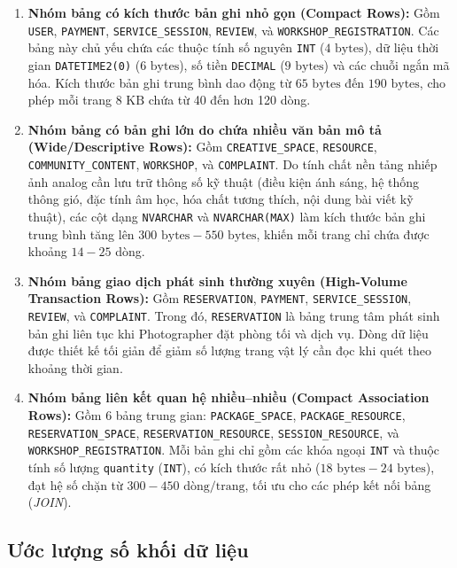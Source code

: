 \begin{enumerate}
    \item \textbf{Nhóm bảng có kích thước bản ghi nhỏ gọn (Compact Rows):}
    Gồm \texttt{USER}, \texttt{PAYMENT}, \texttt{SERVICE\_SESSION}, \texttt{REVIEW}, và \texttt{WORKSHOP\_REGISTRATION}. Các bảng này chủ yếu chứa các thuộc tính số nguyên \texttt{INT} ($4\text{ bytes}$), dữ liệu thời gian \texttt{DATETIME2(0)} ($6\text{ bytes}$), số tiền \texttt{DECIMAL} ($9\text{ bytes}$) và các chuỗi ngắn mã hóa. Kích thước bản ghi trung bình dao động từ $65\text{ bytes}$ đến $190\text{ bytes}$, cho phép mỗi trang $8\text{ KB}$ chứa từ 40 đến hơn 120 dòng.

    \item \textbf{Nhóm bảng có bản ghi lớn do chứa nhiều văn bản mô tả (Wide/Descriptive Rows):}
    Gồm \texttt{CREATIVE\_SPACE}, \texttt{RESOURCE}, \texttt{COMMUNITY\_CONTENT}, \texttt{WORKSHOP}, và \texttt{COMPLAINT}. Do tính chất nền tảng nhiếp ảnh analog cần lưu trữ thông số kỹ thuật (điều kiện ánh sáng, hệ thống thông gió, đặc tính âm học, hóa chất tương thích, nội dung bài viết kỹ thuật), các cột dạng \texttt{NVARCHAR} và \texttt{NVARCHAR(MAX)} làm kích thước bản ghi trung bình tăng lên $300\text{ bytes} - 550\text{ bytes}$, khiến mỗi trang chỉ chứa được khoảng $14 - 25$ dòng.

    \item \textbf{Nhóm bảng giao dịch phát sinh thường xuyên (High-Volume Transaction Rows):}
    Gồm \texttt{RESERVATION}, \texttt{PAYMENT}, \texttt{SERVICE\_SESSION}, \texttt{REVIEW}, và \texttt{COMPLAINT}. Trong đó, \texttt{RESERVATION} là bảng trung tâm phát sinh bản ghi liên tục khi Photographer đặt phòng tối và dịch vụ. Dòng dữ liệu được thiết kế tối giản để giảm số lượng trang vật lý cần đọc khi quét theo khoảng thời gian.

    \item \textbf{Nhóm bảng liên kết quan hệ nhiều--nhiều (Compact Association Rows):}
    Gồm 6 bảng trung gian: \texttt{PACKAGE\_SPACE}, \texttt{PACKAGE\_RESOURCE}, \texttt{RESERVATION\_SPACE}, \texttt{RESERVATION\_RESOURCE}, \texttt{SESSION\_RESOURCE}, và \texttt{WORKSHOP\_REGISTRATION}. Mỗi bản ghi chỉ gồm các khóa ngoại \texttt{INT} và thuộc tính số lượng \texttt{quantity} (\texttt{INT}), có kích thước rất nhỏ ($18\text{ bytes} - 24\text{ bytes}$), đạt hệ số chặn từ $300 - 450\text{ dòng/trang}$, tối ưu cho các phép kết nối bảng (\textit{JOIN}).
\end{enumerate}

\subsection{Ước lượng số khối dữ liệu}

